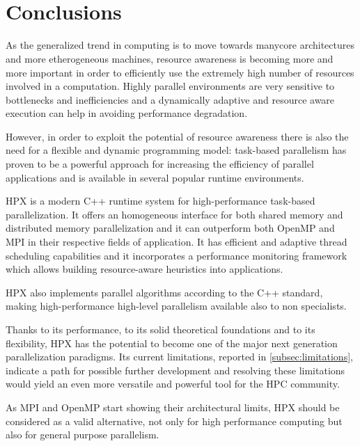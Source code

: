 
~\\~
\section{Conclusions} \label{sec:conclusions}
\enlargethispage{2\baselineskip} %
As the generalized trend in computing is to move towards manycore architectures and more etherogeneous machines, resource awareness is becoming more and more important in order to efficiently use the extremely high number of resources involved in a computation.
Highly parallel environments are very sensitive to bottlenecks and inefficiencies and a dynamically adaptive and resource aware execution can help in avoiding performance degradation.

However, in order to exploit the potential of resource awareness there is also the need for a flexible and dynamic programming model: task-based parallelism has proven to be a powerful approach for increasing the efficiency of parallel applications and is available in several popular runtime environments.

HPX is a modern C++ runtime system for high-performance task-based parallelization. It offers an homogeneous interface for both shared memory and distributed memory parallelization and it can outperform both OpenMP and MPI in their respective fields of application. It has efficient and adaptive thread scheduling capabilities and it incorporates a performance monitoring framework which allows building resource-aware heuristics into applications.

HPX also implements parallel algorithms according to the C++ standard, making high-performance high-level parallelism available also to non specialists.

Thanks to its performance, to its solid theoretical foundations and to its flexibility, HPX has the potential to become one of the major next generation parallelization paradigms.
Its current limitations, reported in \ref{subsec:limitations}, indicate a path for possible further development and resolving these limitations would yield an even more versatile and powerful tool for the HPC community.

As MPI and OpenMP start showing their architectural limits, HPX should be considered as a valid alternative, not only for high performance computing but also for general purpose parallelism.

~\\~
